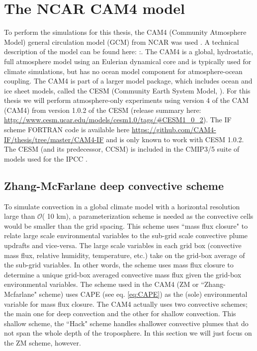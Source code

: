 \documentclass[letterpaper,12pt,titlepage,oneside,final]{book}
\begin{document}
\section{The NCAR CAM4 model}\label{cam4}
To perform the simulations for this thesis, the CAM4 (Community Atmosphere Model) general circulation model (GCM) from NCAR was used \citep{neale_mean_2013}. A technical description of the model can be found here: \citep{neale_description_2010}:. The CAM4 is a global, hydrostatic, full atmosphere model using an Eulerian dynamical core and is typically used for climate simulations, but has no ocean model component for atmosphere-ocean coupling. The CAM4 is part of a larger model package, which includes ocean and ice sheet models, called the CESM (Community Earth System Model, \cite{kay_community_2014}). For this thesis we will perform atmosphere-only experiments using version 4 of the CAM (CAM4) from version 1.0.2 of the CESM (release summary here: \url{http://www.cesm.ucar.edu/models/cesm1.0/tags/#CESM1_0_2}). The IF scheme FORTRAN code is available here \url{https://github.com/CAM4-IF/thesis/tree/master/CAM4-IF} and is only known to work with CESM 1.0.2. The CESM (and its predecessor, CCSM) is included in the CMIP3/5 suite of models used for the IPCC \citep{taylor_overview_2011}. 

\subsection{Zhang-McFarlane deep convective scheme}\label{ZM}
To simulate convection in a global climate model with a horizontal resolution large than $\mathcal{O}$( 10 km), a parameterization scheme is needed as the convective cells would be smaller than the grid spacing. This scheme uses ``mass flux closure" to relate large scale environmental variables to the sub-grid scale convective plume updrafts and vice-versa. The large scale variables in each grid box (convective mass flux, relative humidity, temperature, etc.) take on the grid-box average of the sub-grid variables. In other words, the scheme uses mass flux closure to determine a unique grid-box averaged convective mass flux given the grid-box environmental variables. The scheme used in the CAM4 (ZM or ``Zhang-Mcfarlane" scheme) \citep{zhang_sensitivity_1995} uses CAPE (see eq. \ref{eq:CAPE}) as the (sole) environmental variable for mass flux closure. The CAM4 actually uses two convective schemes; the main one for deep convection and the other for shallow convection. This shallow scheme, the ``Hack" scheme \citep{hack_parameterization_1994} handles shallower convective plumes that do not span the whole depth of the troposphere. In this section we will just focus on the ZM scheme, however.
\end{document}
